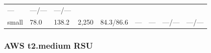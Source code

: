 \documentclass[
  9pt, a4paper, landscape]{article}
\begin{document}
\begin{longtable}[]{@{}lllllllll@{}}
\begin{minipage}[t]{0.08\columnwidth}
---\strut
\end{minipage} & \begin{minipage}[t]{0.08\columnwidth}\raggedright
---/---\strut
\end{minipage} & \begin{minipage}[t]{0.08\columnwidth}\raggedright
---/---\strut
\end{minipage}\tabularnewline
\begin{minipage}[t]{0.08\columnwidth}\raggedright
small\strut
\end{minipage} & \begin{minipage}[t]{0.08\columnwidth}\raggedright
78.0\strut
\end{minipage} & \begin{minipage}[t]{0.08\columnwidth}\raggedright
138.2\strut
\end{minipage} & \begin{minipage}[t]{0.08\columnwidth}\raggedright
2,250\strut
\end{minipage} & \begin{minipage}[t]{0.08\columnwidth}\raggedright
84.3/86.6\strut
\end{minipage} & \begin{minipage}[t]{0.08\columnwidth}\raggedright
---\strut
\end{minipage} & \begin{minipage}[t]{0.08\columnwidth}\raggedright
---\strut
\end{minipage} & \begin{minipage}[t]{0.08\columnwidth}\raggedright
---/---\strut
\end{minipage} & \begin{minipage}[t]{0.08\columnwidth}\raggedright
---/---\strut
\end{minipage}\tabularnewline
\bottomrule
\end{longtable}

\hypertarget{aws-t2.medium-rsu}{%
\subsubsection{AWS t2.medium RSU}\label{aws-t2.medium-rsu}}
\end{document}
